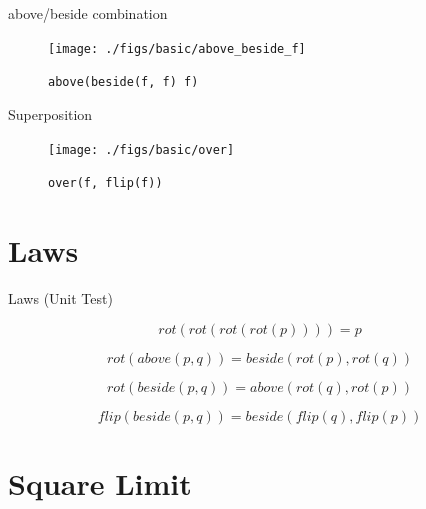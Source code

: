 \documentclass{beamer}
\begin{document}
    \begin{frame}{above/beside combination}
        \begin{figure}
            \centering
            \texttt{[image: ./figs/basic/above\_beside\_f]}
            \caption{\texttt{above(beside(f, f) f)}}
            \label{fig:above_beside_f}
        \end{figure}
    \end{frame}

    \begin{frame}{Superposition}
        \begin{figure}
            \centering
            \texttt{[image: ./figs/basic/over]}
            \caption{\texttt{over(f, flip(f))}}
            \label{fig:over_f}
        \end{figure}
    \end{frame}

    \section{Laws}

    \begin{frame}{Laws (Unit Test)}

        \begin{equation*}
        rot(rot(rot(rot(p)))) = p
        \end{equation*}

        \begin{equation*}
        rot(above(p, q)) = beside(rot(p), rot(q))
        \end{equation*}

        \begin{equation*}
        rot(beside(p, q)) = above(rot(q), rot(p))
        \end{equation*}

        \begin{equation*}
        flip(beside(p, q)) = beside(flip(q), flip(p))
        \end{equation*}
    \end{frame}

    \section{Square Limit}
\end{document}

